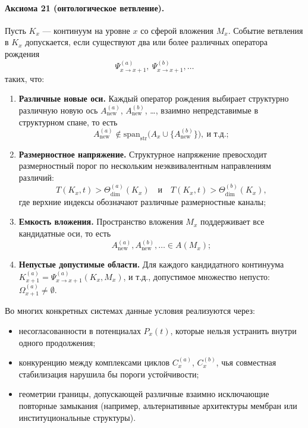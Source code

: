 \paragraph{Аксиома 21 (онтологическое ветвление).}
Пусть \(K_x\) — континуум на уровне \(x\) со сферой вложения \(M_x\). Событие
ветвления в \(K_x\) допускается, если существуют два или более различных
оператора рождения
\[
  \Psi_{x\to x+1}^{(a)},\ \Psi_{x\to x+1}^{(b)},\dots
\]
таких, что:
\begin{enumerate}
  \item \textbf{Различные новые оси.}\quad
        Каждый оператор рождения выбирает структурно различную новую ось
        \(A_{\mathrm{new}}^{(a)}\), \(A_{\mathrm{new}}^{(b)}\), \dots,
        взаимно непредставимые в структурном спане, то есть
        \[
          A_{\mathrm{new}}^{(a)} \notin \mathrm{span}_{\mathrm{str}}
            \big(A_x \cup \{A_{\mathrm{new}}^{(b)}\}\big), \ \text{и т.д.};
        \]
  \item \textbf{Размерностное напряжение.}\quad
        Структурное напряжение превосходит размерностный порог
        по нескольким неэквивалентным направлениям различий:
        \[
          T(K_x,t) > \Theta_{\mathrm{dim}}^{(a)}(K_x)
          \quad\text{и}\quad
          T(K_x,t) > \Theta_{\mathrm{dim}}^{(b)}(K_x),
        \]
        где верхние индексы обозначают различные размерностные каналы;
  \item \textbf{Емкость вложения.}\quad
        Пространство вложения \(M_x\) поддерживает все кандидатные оси, то
        есть
        \[
          A_{\mathrm{new}}^{(a)}, A_{\mathrm{new}}^{(b)}, \dots
          \in A(M_x);
        \]
  \item \textbf{Непустые допустимые области.}\quad
        Для каждого кандидатного континуума
        \(K_{x+1}^{(a)} = \Psi_{x\to x+1}^{(a)}(K_x, M_x)\), и т.д.,
        допустимое множество непусто: \(\Omega_{x+1}^{(a)}\neq\emptyset\).
\end{enumerate}

Во многих конкретных системах данные условия реализуются через:
\begin{itemize}
  \item несогласованности в потенциалах \(P_x(t)\), которые нельзя
        устранить внутри одного продолжения;
  \item конкуренцию между комплексами циклов \(C_x^{(a)}\), \(C_x^{(b)}\),
        чья совместная стабилизация нарушила бы пороги устойчивости;
  \item геометрии границы, допускающей различные взаимно исключающие
        повторные замыкания (например, альтернативные архитектуры
        мембран или институциональные структуры).
\end{itemize}

